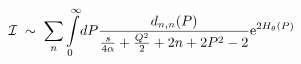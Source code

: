 \begin{equation}
\label{poles}
{\cal I} \; \sim \; \sum_n 
\int\limits_0^{\infty}\!dP 
\frac{d_{n,n}(P)}{\frac{s}{4\alpha} + \frac{Q^2}{2} + 2n + 2P^2 - 2}
{\rm e}^{2H_\theta(P)}
\end{equation}

